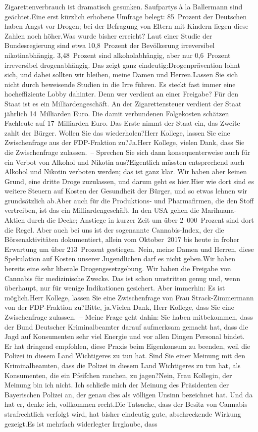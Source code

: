 \documentclass{article}
\begin{document}
Zigarettenverbrauch ist dramatisch gesunken. Saufpartys à la Ballermann sind geächtet.Eine erst kürzlich erhobene Umfrage belegt: 85 Prozent der Deutschen haben Angst vor Drogen; bei der Befragung von Eltern mit Kindern liegen diese Zahlen noch höher.Was wurde bisher erreicht? Laut einer Studie der Bundesregierung sind etwa 10,8 Prozent der Bevölkerung irreversibel nikotinabhängig. 3,48 Prozent sind alkoholabhängig, aber nur 0,6 Prozent irreversibel drogenabhängig. Das zeigt ganz eindeutig:Drogenprävention lohnt sich, und dabei sollten wir bleiben, meine Damen und Herren.Lassen Sie sich nicht durch beweisende Studien in die Irre führen. Es steckt fast immer eine hocheffiziente Lobby dahinter. Denn wer verdient an einer Freigabe? Für den Staat ist es ein Milliardengeschäft. An der Zigarettensteuer verdient der Staat jährlich 14 Milliarden Euro. Die damit verbundenen Folgekosten schätzen Fachleute auf 17 Milliarden Euro. Das Erste nimmt der Staat ein, das Zweite zahlt der Bürger. Wollen Sie das wiederholen?Herr Kollege, lassen Sie eine Zwischenfrage aus der FDP-Fraktion zu?Ja.Herr Kollege, vielen Dank, dass Sie die Zwischenfrage zulassen. – Sprechen Sie sich dann konsequenterweise auch für ein Verbot von Alkohol und Nikotin aus?Eigentlich müssten entsprechend auch Alkohol und Nikotin verboten werden; das ist ganz klar. Wir haben aber keinen Grund, eine dritte Droge zuzulassen, und darum geht es hier.Hier wie dort sind es weitere Steuern auf Kosten der Gesundheit der Bürger, und so etwas lehnen wir grundsätzlich ab.Aber auch für die Produktions- und Pharmafirmen, die den Stoff vertreiben, ist das ein Milliardengeschäft. In den USA gehen die Marihuana-Aktien durch die Decke; Anstiege in kurzer Zeit um über 2 000 Prozent sind dort die Regel. Aber auch bei uns ist der sogenannte Cannabis-Index, der die Börsenaktivitäten dokumentiert, allein vom Oktober 2017 bis heute in froher Erwartung um über 213 Prozent gestiegen. Nein, meine Damen und Herren, diese Spekulation auf Kosten unserer Jugendlichen darf es nicht geben.Wir haben bereits eine sehr liberale Drogengesetzgebung. Wir haben die Freigabe von Cannabis für medizinische Zwecke. Das ist schon umstritten genug und, wenn überhaupt, nur für wenige Indikationen gesichert. Aber immerhin: Es ist möglich.Herr Kollege, lassen Sie eine Zwischenfrage von Frau Strack-Zimmermann von der FDP-Fraktion zu?Bitte, ja.Vielen Dank, Herr Kollege, dass Sie eine Zwischenfrage zulassen. – Meine Frage geht dahin: Sie haben mitbekommen, dass der Bund Deutscher Kriminalbeamter darauf aufmerksam gemacht hat, dass die Jagd auf Konsumenten sehr viel Energie und vor allen Dingen Personal bindet. Er hat dringend empfohlen, diese Praxis beim Eigenkonsum zu beenden, weil die Polizei in diesem Land Wichtigeres zu tun hat. Sind Sie einer Meinung mit den Kriminalbeamten, dass die Polizei in diesem Land Wichtigeres zu tun hat, als Konsumenten, die ein Pfeifchen rauchen, zu jagen?Nein, Frau Kollegin, der Meinung bin ich nicht. Ich schließe mich der Meinung des Präsidenten der Bayerischen Polizei an, der genau dies als völligen Unsinn bezeichnet hat. Und da hat er, denke ich, vollkommen recht.Die Tatsache, dass der Besitz von Cannabis strafrechtlich verfolgt wird, hat bisher eindeutig gute, abschreckende Wirkung gezeigt.Es ist mehrfach widerlegter Irrglaube, dass 
\end{document}
